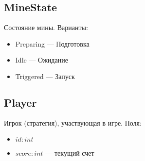 \subsection{MineState}
Состояние мины. Варианты:
\begin{itemize}
    \item Preparing --- Подготовка
    \item Idle --- Ожидание
    \item Triggered --- Запуск
\end{itemize}

\subsection{Player}
Игрок (стратегия), участвующая в игре. Поля:
\begin{itemize}
    \item $id : int$
    \item $score : int$ --- текущий счет
\end{itemize}

